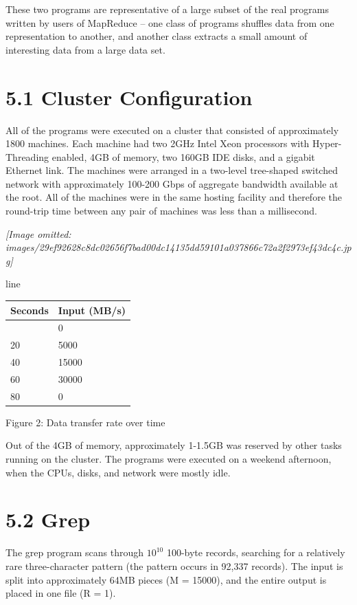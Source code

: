 \documentclass[
]{article}
\newcounter{none} %
\begin{document}
These two programs are representative of a large subset of the real
programs written by users of MapReduce -- one class of programs shuffles
data from one representation to another, and another class extracts a
small amount of interesting data from a large data set.

\section{5.1 Cluster Configuration}\label{cluster-configuration}

All of the programs were executed on a cluster that consisted of
approximately 1800 machines. Each machine had two 2GHz Intel Xeon
processors with Hyper-Threading enabled, 4GB of memory, two 160GB IDE
disks, and a gigabit Ethernet link. The machines were arranged in a
two-level tree-shaped switched network with approximately 100-200 Gbps
of aggregate bandwidth available at the root. All of the machines were
in the same hosting facility and therefore the round-trip time between
any pair of machines was less than a millisecond.

\textit{[Image omitted: images/29ef92628c8dc02656f7bad00dc14135dd59101a037866c72a2f2973ef43dc4c.jpg]}

line

{\def\LTcaptype{none} %
\begin{longtable}[]{@{}ll@{}}
\toprule\noalign{}
Seconds & Input (MB/s) \\
\midrule\noalign{}
\endhead
\bottomrule\noalign{}
\endlastfoot
0 & 0 \\
20 & 5000 \\
40 & 15000 \\
60 & 30000 \\
80 & 0 \\
\end{longtable}
}

Figure 2: Data transfer rate over time

Out of the 4GB of memory, approximately 1-1.5GB was reserved by other
tasks running on the cluster. The programs were executed on a weekend
afternoon, when the CPUs, disks, and network were mostly idle.

\section{5.2 Grep}\label{grep}

The grep program scans through \(10^{10}\) 100-byte records, searching
for a relatively rare three-character pattern (the pattern occurs in
92,337 records). The input is split into approximately 64MB pieces (M =
15000), and the entire output is placed in one file (R = 1).
\end{document}
